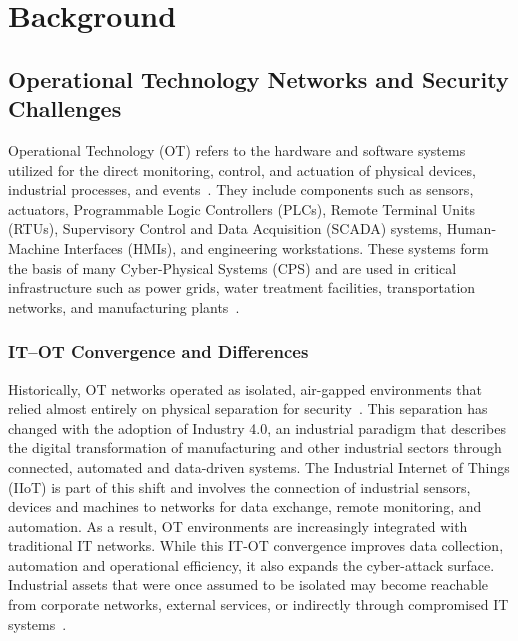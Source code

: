 


\chapter{Background}
\label{ch:related_work}
\section{Operational Technology Networks and Security Challenges}
\label{sec:ot_security_challenges}
Operational Technology (OT) refers to the hardware and software systems utilized for the direct monitoring, control, and actuation of physical devices, industrial processes, and events~\cite{kapoor_cyber_2025}. They include components such as sensors, actuators, Programmable Logic Controllers (PLCs), Remote Terminal Units (RTUs), Supervisory Control and Data Acquisition (SCADA) systems, Human-Machine Interfaces (HMIs), and engineering workstations.  These systems form the basis of many Cyber-Physical Systems (CPS) and are used in critical infrastructure such as power grids, water treatment facilities, transportation networks, and manufacturing plants~\cite{wang_guardians_2026}.

\subsection{IT--OT Convergence and Differences}
Historically, OT networks operated as isolated, air-gapped environments that relied almost entirely on physical separation for security~\cite{jeffrey_hybrid_2024}. This separation has changed with the adoption of Industry 4.0, an industrial paradigm that describes the digital transformation of manufacturing and other industrial sectors through connected, automated and data-driven systems. The Industrial Internet of Things (IIoT) is part of this shift and involves the connection of  industrial sensors, devices and machines to networks for data exchange, remote monitoring, and automation. As a result, OT environments are increasingly integrated with traditional IT networks. While this IT-OT convergence improves data collection, automation and operational efficiency, it also expands the cyber-attack surface. Industrial assets that were once assumed to be isolated may become reachable from corporate networks, external services, or indirectly through compromised IT systems~\cite{kapoor_cyber_2025, jeffrey_hybrid_2024}.

